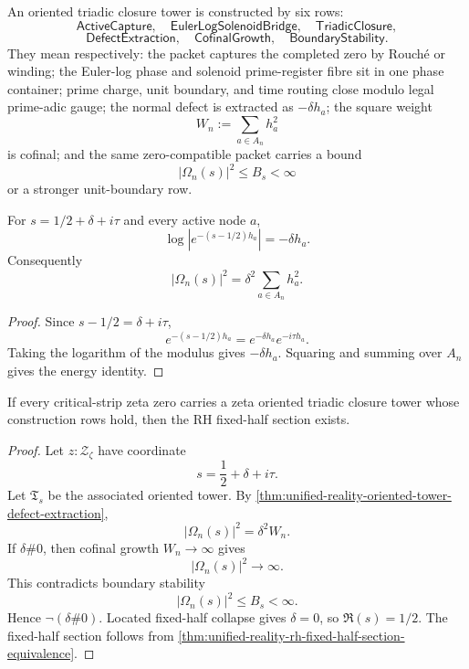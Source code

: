\begin{definition}
\label{def:unified-reality-oriented-tower-construction-rows}
An oriented triadic closure tower is constructed by six rows:
$$
\mathsf{ActiveCapture},
\quad
\mathsf{EulerLogSolenoidBridge},
\quad
\mathsf{TriadicClosure},
$$
$$
\mathsf{DefectExtraction},
\quad
\mathsf{CofinalGrowth},
\quad
\mathsf{BoundaryStability}.
$$
They mean respectively:
the packet captures the completed zero by Rouch\'e or winding; the
Euler-log phase and solenoid prime-register fibre sit in one phase
container; prime charge, unit boundary, and time routing close modulo
legal prime-adic gauge; the normal defect is extracted as
$-\delta h_a$; the square weight
$$
W_n:=\sum_{a\in A_n}h_a^2
$$
is cofinal; and the same zero-compatible packet carries a bound
$$
|\Omega_n(s)|^2\le B_s<\infty
$$
or a stronger unit-boundary row.
\end{definition}

\begin{theorem}
\label{thm:unified-reality-oriented-tower-defect-extraction}
For $s=1/2+\delta+i\tau$ and every active node $a$,
$$
\log|e^{-(s-1/2)h_a}|=-\delta h_a.
$$
Consequently
$$
|\Omega_n(s)|^2
=
\delta^2\sum_{a\in A_n}h_a^2.
$$
\end{theorem}

\begin{proof}
Since $s-1/2=\delta+i\tau$,
$$
e^{-(s-1/2)h_a}
=
e^{-\delta h_a}e^{-i\tau h_a}.
$$
Taking the logarithm of the modulus gives $-\delta h_a$.  Squaring and
summing over $A_n$ gives the energy identity.
\end{proof}

\begin{theorem}
\label{thm:unified-reality-oriented-triadic-closure-towers-conditionally-sufficient}
If every critical-strip zeta zero carries a zeta oriented triadic closure
tower whose construction rows hold, then the RH fixed-half section
exists.
\end{theorem}

\begin{proof}
Let $z:\mathcal Z_{\zeta}$ have coordinate
$$
s=\frac12+\delta+i\tau.
$$
Let $\mathfrak T_s$ be the associated oriented tower.  By
\autoref{thm:unified-reality-oriented-tower-defect-extraction},
$$
|\Omega_n(s)|^2=\delta^2W_n.
$$
If $\delta\#0$, then cofinal growth $W_n\to\infty$ gives
$$
|\Omega_n(s)|^2\to\infty.
$$
This contradicts boundary stability
$$
|\Omega_n(s)|^2\le B_s<\infty.
$$
Hence $\neg(\delta\#0)$.  Located fixed-half collapse gives
$\delta=0$, so $\Re(s)=1/2$.  The fixed-half section follows from
\autoref{thm:unified-reality-rh-fixed-half-section-equivalence}.
\end{proof}

